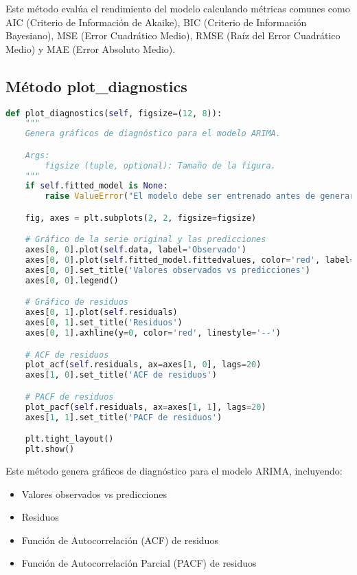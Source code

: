 \documentclass[12pt,letterpaper]{report}
\begin{document}
Este método evalúa el rendimiento del modelo calculando métricas comunes como AIC (Criterio de Información de Akaike), BIC (Criterio de Información Bayesiano), MSE (Error Cuadrático Medio), RMSE (Raíz del Error Cuadrático Medio) y MAE (Error Absoluto Medio).

\subsection{Método plot\_diagnostics}
\begin{lstlisting}[language=python]
def plot_diagnostics(self, figsize=(12, 8)):
    """
    Genera gráficos de diagnóstico para el modelo ARIMA.

    Args:
        figsize (tuple, optional): Tamaño de la figura.
    """
    if self.fitted_model is None:
        raise ValueError("El modelo debe ser entrenado antes de generar diagnósticos")

    fig, axes = plt.subplots(2, 2, figsize=figsize)

    # Gráfico de la serie original y las predicciones
    axes[0, 0].plot(self.data, label='Observado')
    axes[0, 0].plot(self.fitted_model.fittedvalues, color='red', label='Predicciones')
    axes[0, 0].set_title('Valores observados vs predicciones')
    axes[0, 0].legend()

    # Gráfico de residuos
    axes[0, 1].plot(self.residuals)
    axes[0, 1].set_title('Residuos')
    axes[0, 1].axhline(y=0, color='red', linestyle='--')

    # ACF de residuos
    plot_acf(self.residuals, ax=axes[1, 0], lags=20)
    axes[1, 0].set_title('ACF de residuos')

    # PACF de residuos
    plot_pacf(self.residuals, ax=axes[1, 1], lags=20)
    axes[1, 1].set_title('PACF de residuos')

    plt.tight_layout()
    plt.show()
\end{lstlisting}

Este método genera gráficos de diagnóstico para el modelo ARIMA, incluyendo:
\begin{itemize}
    \item Valores observados vs predicciones
    \item Residuos
    \item Función de Autocorrelación (ACF) de residuos
    \item Función de Autocorrelación Parcial (PACF) de residuos
\end{itemize}
\end{document}
